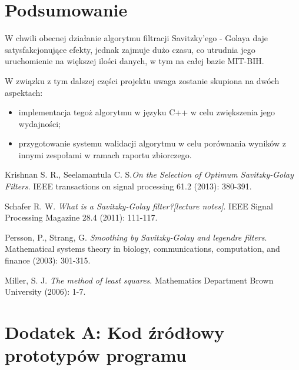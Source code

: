 \documentclass[a4paper]{article}
\begin{document}

\section{Podsumowanie}

W chwili obecnej działanie algorytmu filtracji Savitzky'ego - Golaya daje satysfakcjonujące efekty, jednak zajmuje dużo czasu, co utrudnia jego uruchomienie na większej ilości danych, w tym na całej bazie MIT-BIH.

W związku z tym dalszej części projektu uwaga zostanie skupiona na dwóch aspektach:
\begin{itemize}
\item implementacja tegoż algorytmu w języku C++ w celu zwiększenia jego wydajności;
\item przygotowanie systemu walidacji algorytmu w celu porównania wyników z innymi zespołami w ramach raportu zbiorczego.
\end{itemize}


\begin{thebibliography}{9}

Krishnan S. R., Seelamantula C. S.\textit{On the Selection of Optimum Savitzky-Golay Filters}. IEEE transactions on signal processing 61.2 (2013): 380-391.

Schafer R. W. \textit{What is a Savitzky-Golay filter?[lecture notes]}. IEEE Signal Processing Magazine 28.4 (2011): 111-117.

Persson, P., Strang, G. \textit{Smoothing by Savitzky-Golay and legendre filters}. Mathematical systems theory in biology, communications, computation, and finance (2003): 301-315.

Miller, S. J. \textit{The method of least squares}. Mathematics Department Brown University (2006): 1-7.

\end{thebibliography}


\pagebreak\newpage

\section*{Dodatek A: Kod źródłowy prototypów programu}




\end{document}
